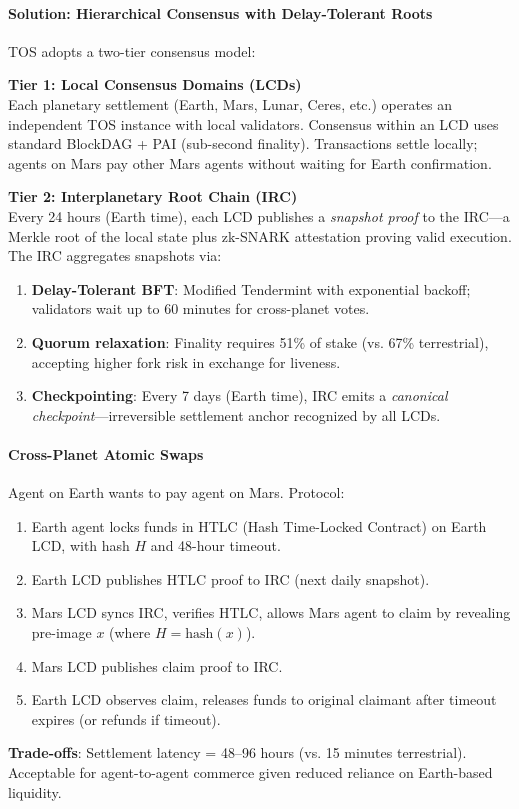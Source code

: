 \documentclass[11pt]{article}
\begin{document}
\paragraph{Solution: Hierarchical Consensus with Delay-Tolerant Roots}
TOS adopts a two-tier consensus model:

\textbf{Tier 1: Local Consensus Domains (LCDs)}\\
Each planetary settlement (Earth, Mars, Lunar, Ceres, etc.) operates an independent TOS instance with local validators. Consensus within an LCD uses standard BlockDAG + PAI (sub-second finality). Transactions settle locally; agents on Mars pay other Mars agents without waiting for Earth confirmation.

\textbf{Tier 2: Interplanetary Root Chain (IRC)}\\
Every 24 hours (Earth time), each LCD publishes a \emph{snapshot proof} to the IRC—a Merkle root of the local state plus zk-SNARK attestation proving valid execution. The IRC aggregates snapshots via:
\begin{enumerate}[noitemsep]
  \item \textbf{Delay-Tolerant BFT}: Modified Tendermint with exponential backoff; validators wait up to 60 minutes for cross-planet votes.
  \item \textbf{Quorum relaxation}: Finality requires 51\% of stake (vs. 67\% terrestrial), accepting higher fork risk in exchange for liveness.
  \item \textbf{Checkpointing}: Every 7 days (Earth time), IRC emits a \emph{canonical checkpoint}—irreversible settlement anchor recognized by all LCDs.
\end{enumerate}

\paragraph{Cross-Planet Atomic Swaps}
Agent on Earth wants to pay agent on Mars. Protocol:
\begin{enumerate}[noitemsep]
  \item Earth agent locks funds in HTLC (Hash Time-Locked Contract) on Earth LCD, with hash $H$ and 48-hour timeout.
  \item Earth LCD publishes HTLC proof to IRC (next daily snapshot).
  \item Mars LCD syncs IRC, verifies HTLC, allows Mars agent to claim by revealing pre-image $x$ (where $H = \text{hash}(x)$).
  \item Mars LCD publishes claim proof to IRC.
  \item Earth LCD observes claim, releases funds to original claimant after timeout expires (or refunds if timeout).
\end{enumerate}
\textbf{Trade-offs}: Settlement latency = 48--96 hours (vs. 15 minutes terrestrial). Acceptable for agent-to-agent commerce given reduced reliance on Earth-based liquidity.
\end{document}
